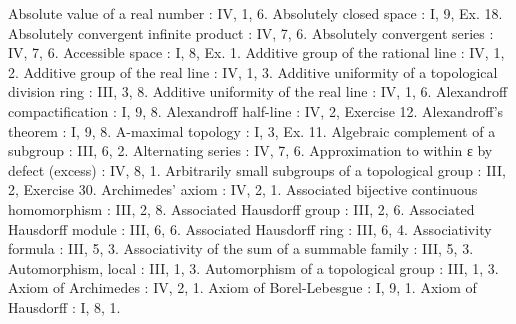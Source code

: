 Absolute value of a real number : IV, 1, 6. Absolutely closed space : I, 9, Ex. 18. Absolutely convergent infinite product : IV, 7, 6. Absolutely convergent series : IV, 7, 6. Accessible space : I, 8, Ex. 1. Additive group of the rational line : IV, 1, 2. Additive group of the real line : IV, 1, 3. Additive uniformity of a topological division ring : III, 3, 8. Additive uniformity of the real line : IV, 1, 6. Alexandroff compactification : I, 9, 8. Alexandroff half-line : IV, 2, Exercise 12. Alexandroff's theorem : I, 9, 8. A-maximal topology : I, 3, Ex. 11. Algebraic complement of a subgroup : III, 6, 2. Alternating series : IV, 7, 6. Approximation to within ε by defect (excess) : IV, 8, 1. Arbitrarily small subgroups of a topological group : III, 2, Exercise 30. Archimedes' axiom : IV, 2, 1. Associated bijective continuous homomorphism : III, 2, 8. Associated Hausdorff group : III, 2, 6. Associated Hausdorff module : III, 6, 6. Associated Hausdorff ring : III, 6, 4. Associativity formula : III, 5, 3. Associativity of the sum of a summable family : III, 5, 3. Automorphism, local : III, 1, 3. Automorphism of a topological group : III, 1, 3. Axiom of Archimedes : IV, 2, 1. Axiom of Borel-Lebesgue : I, 9, 1. Axiom of Hausdorff : I, 8, 1.

